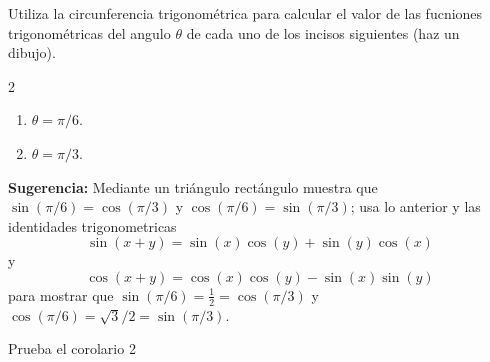 \documentclass[12pt,a4paper]{article}
\begin{document}
    \begin{mdframed}[style=mdbluebox,frametitle={Ejercicio 2}]
        Utiliza la circunferencia trigonométrica para calcular el valor de las fucniones trigonométricas
        del angulo $\theta$ de cada uno de los incisos siguientes (haz un dibujo).
        \begin{multicols}{2}
            \begin{enumerate}
                \item[(a)]  $\theta=\pi/6.$
                \item[(b)]  $\theta=\pi/3.$
            \end{enumerate}
        \end{multicols}
        \textbf{Sugerencia:} Mediante un triángulo rectángulo muestra que $\sin(\pi/6)=\cos(\pi/3)$ y
        $\cos(\pi/6)=\sin(\pi/3)$; usa lo anterior y las identidades trigonometricas
        \begin{equation*}
            \sin(x+y)=\sin(x)\cos(y)+\sin(y)\cos(x)
        \end{equation*}
        y
        \begin{equation*}
            \cos(x+y)=\cos(x)\cos(y)-\sin(x)\sin(y)
        \end{equation*}
        para mostrar que $\sin(\pi/6)=\frac{1}{2}=\cos(\pi/3)$ y $\cos(\pi/6)=\sqrt{3}/2=\sin(\pi/3)$.
    \end{mdframed}

    \begin{mdframed}[style=mdbluebox,frametitle={Ejercicio 3}]
        Prueba el corolario 2
    \end{mdframed}
\end{document}
